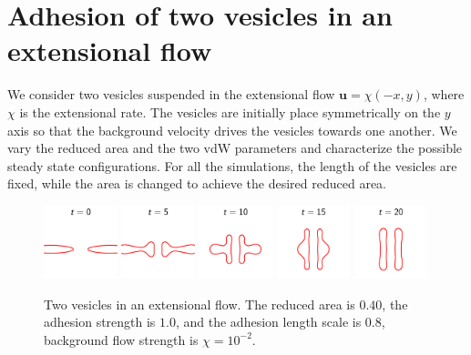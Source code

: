 \documentclass[%
preprint,
 amsmath,amssymb,
 aps,
]{revtex4-1}
\newcommand{\uu}{\mathbf{u}}
\begin{document}
\newpage %
\section{Adhesion of two vesicles in an extensional flow} 
\label{sec:eflow} 
We consider two vesicles suspended in the extensional flow $\uu =
\chi(-x,y)$, where $\chi$ is the extensional rate.  The vesicles are
initially place symmetrically on the $y$ axis so that the background
velocity drives the vesicles towards one another.  We vary the reduced
area and the two vdW parameters and characterize the possible steady
state configurations.  For all the simulations, the length of the
vesicles are fixed, while the area is changed to achieve the desired
reduced area.

\begin{figure}[htp]
  \includegraphics[width = 0.19\textwidth]{figs/extensional_adR8em1adS1e0_ra040_timestep1.pdf}
  \includegraphics[width = 0.19\textwidth]{figs/extensional_adR8em1adS1e0_ra040_timestep2.pdf}
  \includegraphics[width = 0.19\textwidth]{figs/extensional_adR8em1adS1e0_ra040_timestep3.pdf}
  \includegraphics[width = 0.19\textwidth]{figs/extensional_adR8em1adS1e0_ra040_timestep4.pdf}
  \includegraphics[width = 0.19\textwidth]{figs/extensional_adR8em1adS1e0_ra040_timestep5.pdf}
  \caption{Two vesicles in an extensional flow.  The reduced area is
  $0.40$, the adhesion strength is $1.0$, and the adhesion length scale
is $0.8$, background flow strength is $\chi = 10^{-2}$.}
\end{figure}
\end{document}
